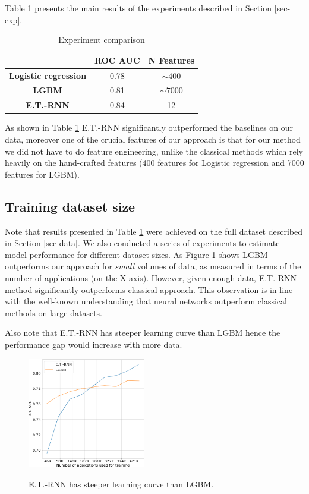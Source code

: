 \documentclass[sigconf]{acmart}
\begin{document}
Table \ref{tab-res} presents the main results of the experiments described in Section \ref{sec-exp}.

\begin{table}[ht]
\caption{Experiment comparison}
\begin{tabular}{ | c | c | c | }
\hline
& \textbf{ROC AUC} & \textbf{N Features} \\
\hline
\textbf{Logistic regression} & 0.78 & $\sim400$ \\
\textbf{LGBM} & 0.81 & $\sim7000$ \\
\textbf{E.T.-RNN} & 0.84 & 12 \\
\hline
\end{tabular}
\label{tab-res}
\end{table}

As shown in Table \ref{tab-res} E.T.-RNN significantly outperformed the baselines on our data, moreover one of the crucial features of our approach is that for our method we did not have to do feature engineering, unlike the classical methods which rely heavily on the hand-crafted features (400 features for Logistic regression and 7000 features for LGBM).

\subsection{Training dataset size}

Note that results presented in Table \ref{tab-res} were achieved on the full dataset described in Section \ref{sec-data}. We also conducted a series of experiments to estimate model performance for different dataset sizes.
As Figure \ref{fig-lc} shows LGBM outperforms our approach for \textit{small} volumes of data, as measured in terms of the number of applications (on the X axis). However, given enough data, E.T.-RNN method significantly outperforms classical approach. This observation is in line with the well-known understanding that neural networks outperform classical methods on large datasets.

Also note that E.T.-RNN has steeper learning curve than LGBM hence the performance gap would increase with more data.

\begin{figure}[ht]
  \caption{E.T.-RNN has steeper learning curve than LGBM.}
  \includegraphics[width=0.46\textwidth]{figures/learning-curve.png}
  \label{fig-lc}
\end{figure}
\end{document}
